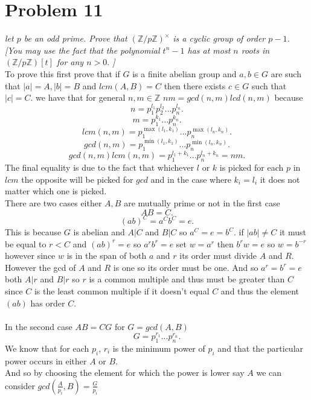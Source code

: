 \documentclass{article}
\begin{document}
    \section{Problem 11}
    \emph{
        let $p$ be an odd prime. Prove that $( \mathbb{Z} / p \mathbb{Z} )^{\times}$ is 
        a cyclic group of order $p-1$. [You may use the fact that the polynomial
        $t^{n}-1$ has at most $n$ roots in $( \mathbb{Z} / p \mathbb{Z} )[t]$ for any $n > 0.$ ]
    }\\
    To prove this first prove that if  $G$ is a finite abelian group and $a,b \in G$ are such that
    $|a| = A, |b| = B$ and $lcm(A, B) = C$ then there exists $c \in G $ such that $|c| = C$.
    we have that for general $n,m \in \mathbb{Z} $ $nm = gcd(n,m) lcd(n,m)$ because 
     \[
    n = p_1^{l_1}p_2^{l_2}...p_n^{l_n}
    .\] 
    \[
    m = p_1^{k_1}...p_n^{k_n}
    .\] 
    \[
    lcm(n,m) = p_1^{\max(l_1,k_1)}...p_n^{\max(l_n,k_n)}
    .\] 
    \[
    gcd(n,m) = p_1^{\min(l_1,k_1)}...p_n^{\min(l_n,k_n)}
    .\] 
    \[
    gcd(n,m)lcm(n,m) = p_1^{l_1+k_1}...p_n^{l_n+k_n} = nm
    .\] 
    The final equality is due to the fact that whichever $l$ or $k$ is picked for each $p$ in $lcm$ the opposite will be picked for $gcd$ 
    and in the case where $k_i = l_i$ it does not matter which one is picked.\\
    There are two cases either $A,B$ are mutually prime or not in the first case
    \[
    AB = C
    .\] 
    \[
        (ab)^{C} = a^{C}b^{C} = e
    .\] 
    This is because $G$ is abelian and $A|C$ and $B|C$ so $a^{C} = e = b^{C}$. if $|ab| \ne C$ it must be  equal to $r < C$
    and  $(ab)^{r} = e$ so $a^{r}b^{r}=e$ set $w = a^{r}$ then $b^{r}w = e$ so $w = b^{-r}$
    however since $w$ is in the span of both $a$ and $r$ its order must divide $A$ and $R$. However the gcd of $A$ and $R$ is one so its order must be one.
    And so $a^{r} = b^{r} = e$
    both $A | r$ and $B | r$ so $r$ is a common multiple and thus must be greater than $C$ since $C$ is the least common multiple if it doesn't equal $C$ and thus
    the element $(ab)$ has order $C$.\\ \\
    In the second case $AB = CG$ for $G = gcd(A,B)$ 
    \[
    G = p_1^{r_1}...p_n^{r_n}
    .\] 
    We know that for each $p_i$, $r_i$ is the minimum power of $p_i$ and that the particular power occurs in either $A$ or $B$.\\
    And so by choosing the element for which the power is lower say $A$ we can consider $gcd(\frac{A}{p_i},B) = \frac{G}{p_i}$ 
\end{document}
